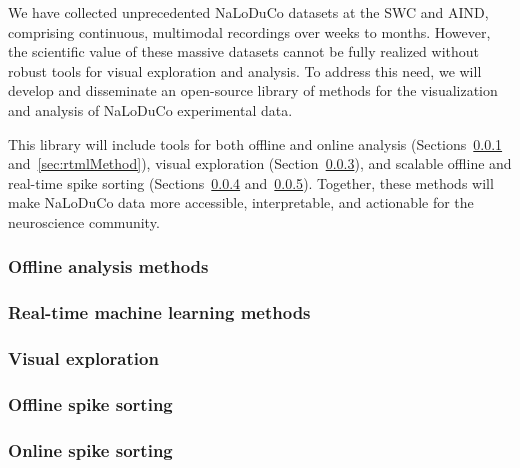We have collected unprecedented NaLoDuCo datasets at the SWC and AIND,
comprising continuous, multimodal recordings over weeks to months. However, the
scientific value of these massive datasets cannot be fully realized without
robust tools for visual exploration and analysis. To address this need, we will
develop and disseminate an open-source library of methods for the visualization
and analysis of NaLoDuCo experimental data.

This library will include tools for both offline and online analysis
(Sections~\ref{sec:offlineAnalysisMethods}
and~\ref{sec:rtmlMethod}), visual exploration
(Section~\ref{sec:visualExploration}), and scalable offline and real-time spike
sorting (Sections~\ref{sec:offlineSpikeSorting}
and~\ref{sec:onlineSpikeSorting}). Together, these methods will make NaLoDuCo
data more accessible, interpretable, and actionable for the neuroscience
community.

\subsubsection{Offline analysis methods}
\label{sec:offlineAnalysisMethods}



\subsubsection{Real-time machine learning methods}
\label{sec:rtmlMethods}



\subsubsection{Visual exploration}
\label{sec:visualExploration}



\subsubsection{Offline spike sorting}
\label{sec:offlineSpikeSorting}



\subsubsection{Online spike sorting}
\label{sec:onlineSpikeSorting}


